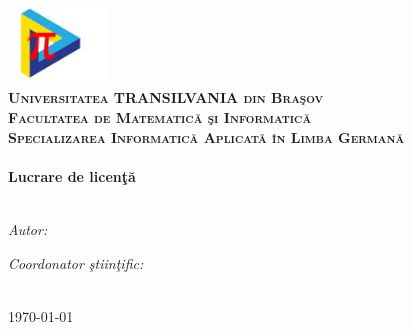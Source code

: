 \begin{titlepage}
\begin{center}
\includegraphics[width=0.2\textwidth]{./Pictures/LOGO.JPEG}\\[0.5cm]
\textsc{\LARGE \textbf{Universitatea TRANSILVANIA din Bra\c sov }}\\[0.5cm]
\textsc{\LARGE \textbf{Facultatea de Matematic\u a \c si Informatic\u a }}\\[0.5cm]
\textsc{\Large \textbf{Specializarea Informatic\u a Aplicat\u a \^ in Limba German\u a}}\\[3cm]

\HRule \\[0.4cm] %
{\LARGE \bfseries \textbf{Lucrare de licen\c t\u a}}\\[0.4cm] %
\HRule \\[1.5cm] %
 
\begin{minipage}{0.4\textwidth}
\begin{flushleft} \large
\emph{Autor:}\\
\authornames %
\end{flushleft}
\end{minipage}
\begin{minipage}{0.4\textwidth}
\begin{flushright} \large
\emph{Coordonator \c stiin\c tific:} \\
\supname %
\end{flushright}
\end{minipage}\\[8cm]
 


{\large \today}\\[4cm] %
 
\vfill
\end{center}

\end{titlepage}
